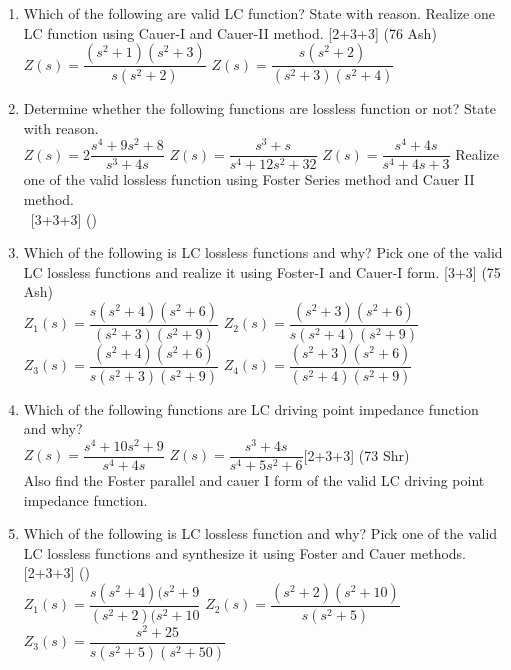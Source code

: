 \documentclass[12pt]{article}
\newcommand{\enter}{\\\textcolor{white}{1}}
\begin{document}
\begin{enumerate}
	\item Which of the following are valid LC function? State with reason. Realize one LC function using Cauer-I and Cauer-II method. \hfill [2+3+3] (76 Ash)\\
	$Z(s) = \dfrac{(s^2+1)(s^2+3)}{s(s^2+2)}$ \hspace{2cm}
	$Z(s) = \dfrac{s(s^2+2)}{(s^2+3)(s^2+4)}$
	
	\item Determine whether the following functions are lossless function or not? State with reason. \\
	$Z(s) = 2\dfrac{s^4+9s^2+8}{s^3+4s}$ \hspace{2cm}
	$Z(s) = \dfrac{s^3+s}{s^4+12s^2+32}$ \hspace{2cm}
	$Z(s) = \dfrac{s^4+4s}{s^4+4s+3}$
	Realize one of the valid lossless function using Foster Series method and Cauer II method.
	\enter\hfill [3+3+3] ()
	
	\item Which of the following is LC lossless functions and why? Pick one of the valid LC lossless functions and realize it using Foster-I and Cauer-I form. \hfill [3+3] (75 Ash)\\
	$Z_1(s) = \dfrac{s(s^2+4)(s^2+6)}{(s^2+3)(s^2+9)}$ \hspace{2cm}
	$Z_2(s) = \dfrac{(s^2+3)(s^2+6)}{s(s^2+4)(s^2+9)}$ \\
	$Z_3(s) = \dfrac{(s^2+4)(s^2+6)}{s(s^2+3)(s^2+9)}$ \hspace{2cm}
	$Z_4(s) = \dfrac{(s^2+3)(s^2+6)}{(s^2+4)(s^2+9)}$
	
	\item Which of the following functions are LC driving point impedance function and why?\\
	$Z(s) = \dfrac{s^4+10s^2+9}{s^4+4s}$ \hspace{2cm}
	$Z(s) = \dfrac{s^3+4s}{s^4+5s^2+6}$\hfill [2+3+3] (73 Shr)\\
	Also find the Foster parallel and cauer I form of the valid LC driving point impedance function.
	
	\item Which of the following is LC lossless function and why? Pick one of the valid LC lossless functions and synthesize it using Foster and Cauer methods. \hfill [2+3+3] ()\\
	$Z_1(s)=\dfrac{s(s^2+4)(s^2+9}{(s^2+2)(s^2+10}$ \hspace{2cm}
	$Z_2(s)=\dfrac{(s^2+2)(s^2+10)}{s(s^2+5)}$ \hspace{2cm}
	$Z_3(s)=\dfrac{s^2+25}{s(s^2+5)(s^2+50)}$
	

\end{enumerate}
\end{document}
